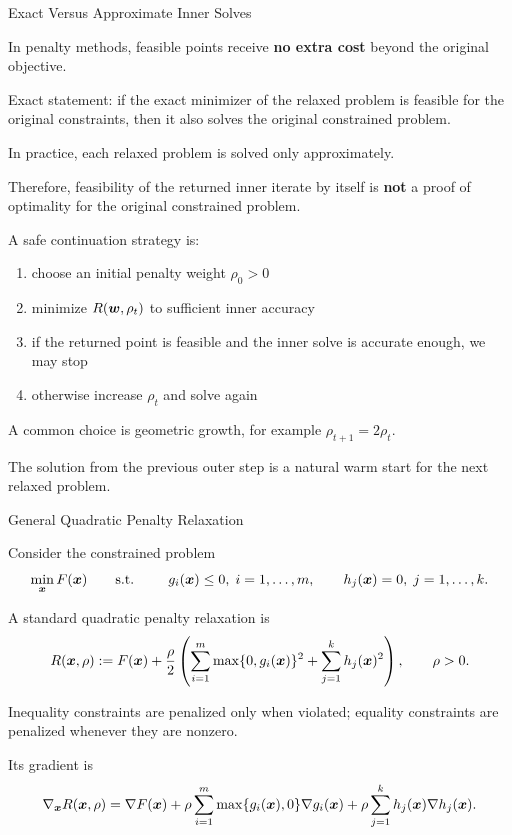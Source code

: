 \documentclass[11pt,compress,t,notes=noshow, xcolor=table]{beamer}
\begin{document}
\begin{framei}[fs=small]{Exact Versus Approximate Inner Solves}
\item In penalty methods, feasible points receive \textbf{no extra cost} beyond the original objective.
\item Exact statement: if the exact minimizer of the relaxed problem is feasible for the original constraints, then it also solves the original constrained problem.
\item In practice, each relaxed problem is solved only approximately.
\item Therefore, feasibility of the returned inner iterate by itself is \textbf{not} a proof of optimality for the original constrained problem.
\item A safe continuation strategy is:
\begin{enumerate}
\item choose an initial penalty weight $\rho_0 > 0$
\item minimize $R(\bm{w},\rho_t)$ to sufficient inner accuracy
\item if the returned point is feasible and the inner solve is accurate enough, we may stop
\item otherwise increase $\rho_t$ and solve again
\end{enumerate}
\item A common choice is geometric growth, for example $\rho_{t+1} = 2 \rho_t$.
\item The solution from the previous outer step is a natural warm start for the next relaxed problem.
\end{framei}


\begin{framei}[fs=footnotesize]{General Quadratic Penalty Relaxation}
\item Consider the constrained problem
$$
\min_{\bm{x}} F(\bm{x})
\qquad
\text{s.t. }
\qquad
g_i(\bm{x}) \le 0,\; i=1,\dots,m,
\qquad
h_j(\bm{x}) = 0,\; j=1,\dots,k.
$$
\item A standard quadratic penalty relaxation is
$$
R(\bm{x},\rho)
:=
F(\bm{x})
+
\frac{\rho}{2}
\left(
\sum_{i=1}^m \max\{0,g_i(\bm{x})\}^2
+
\sum_{j=1}^k h_j(\bm{x})^2
\right),
\qquad \rho > 0.
$$
\item Inequality constraints are penalized only when violated; equality constraints are penalized whenever they are nonzero.
\item Its gradient is
$$
\nabla_{\bm{x}} R(\bm{x},\rho)
=
\nabla F(\bm{x})
+
\rho \sum_{i=1}^m \max\{g_i(\bm{x}),0\}\nabla g_i(\bm{x})
+
\rho \sum_{j=1}^k h_j(\bm{x})\nabla h_j(\bm{x}).
$$
\end{framei}
\end{document}
